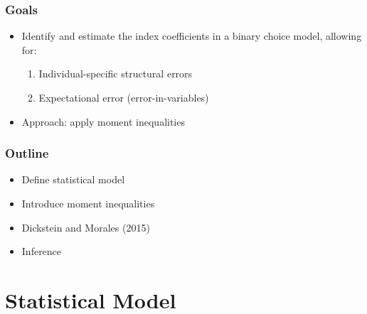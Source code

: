 \documentclass[10pt,letterpaper]{beamer}
\begin{document}

\begin{frame}
\frametitle{Goals}

\begin{itemize}
\item Identify and estimate the index coefficients in a binary choice model,
allowing for: 

\begin{enumerate}
\item Individual-specific structural errors 

\item Expectational error (error-in-variables) 
\end{enumerate}

\item Approach: apply moment inequalities
\end{itemize}
\end{frame}


\begin{frame}
\frametitle{Outline}

\begin{itemize}
\item Define statistical model

\item Introduce moment inequalities

\item Dickstein and Morales (2015)

\item Inference
\end{itemize}
\end{frame}


\section{Statistical Model}

\end{document}
